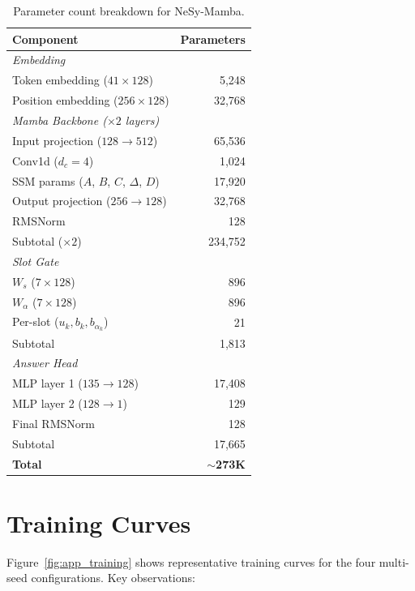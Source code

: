 \documentclass[conference]{IEEEtran}
\DeclareRobustCommand{\model}{NeSy-Mamba}
\begin{document}
\begin{table}[H]
\centering
\small
\caption{Parameter count breakdown for \model{}.}
\label{tab:params_breakdown}
\begin{tabular}{@{}lr@{}}
\toprule
\textbf{Component} & \textbf{Parameters} \\
\midrule
\multicolumn{2}{l}{\textit{Embedding}} \\
Token embedding ($41 \times 128$) & 5,248 \\
Position embedding ($256 \times 128$) & 32,768 \\
\midrule
\multicolumn{2}{l}{\textit{Mamba Backbone ($\times 2$ layers)}} \\
Input projection ($128 \to 512$) & 65,536 \\
Conv1d ($d_c = 4$) & 1,024 \\
SSM params ($A$, $B$, $C$, $\Delta$, $D$) & 17,920 \\
Output projection ($256 \to 128$) & 32,768 \\
RMSNorm & 128 \\
Subtotal ($\times 2$) & 234,752 \\
\midrule
\multicolumn{2}{l}{\textit{Slot Gate}} \\
$W_s$ ($7 \times 128$) & 896 \\
$W_\alpha$ ($7 \times 128$) & 896 \\
Per-slot ($u_k, b_k, b_{\alpha_k}$) & 21 \\
Subtotal & 1,813 \\
\midrule
\multicolumn{2}{l}{\textit{Answer Head}} \\
MLP layer 1 ($135 \to 128$) & 17,408 \\
MLP layer 2 ($128 \to 1$) & 129 \\
Final RMSNorm & 128 \\
Subtotal & 17,665 \\
\midrule
\textbf{Total} & \textbf{$\sim$273K} \\
\bottomrule
\end{tabular}
\end{table}

\section{Training Curves}
\label{app:training}

Figure~\ref{fig:app_training} shows representative training curves
for the four multi-seed configurations.  Key observations:
\end{document}
